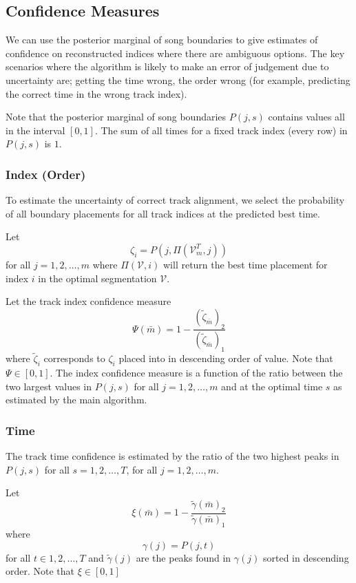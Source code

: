 \documentclass[twocolumn]{article}
\newcommand{\best}{\mathcal V}
\begin{document}
\subsection{Confidence Measures}

We can use the posterior marginal of song boundaries to give estimates of confidence on reconstructed indices where there are ambiguous options. The key scenarios where the algorithm is likely to make an error of judgement due to uncertainty are; getting the time wrong, the order wrong (for example, predicting the correct time in the wrong track index).

Note that the posterior marginal of song boundaries $P(j,s)$ contains values all in the interval $[0,1]$. The sum of all times for a fixed track index (every row) in $P(j,s)$ is $1$.

\subsubsection{Index (Order)}

To estimate the uncertainty of correct track alignment, we select the probability of all boundary placements for all track indices at the predicted best time. 

Let 
\[
\zeta_{ i} = P\left( j, \Pi\left(\best^T_m,j\right)  \right)
\] for all $j=1,2,\ldots,m$ where $\Pi(\best,i)$ will return the best time placement for index $i$ in the optimal segmentation $\best$.

Let the track index confidence measure 
\[
\Psi(\bar m)= 1- \frac{ \left(\tilde \zeta_{\bar m}\right) _2 }{ \left(\tilde \zeta_{\bar m}\right)_1 }
\] where $\tilde \zeta_{i}$ corresponds to $\zeta_{i}$ placed into in descending order of value. Note that $\Psi \in [0,1]$. The index confidence measure is a function of the ratio between the two largest values in $P(j,s)$ for all $j=1,2,\ldots,m$ and at the optimal time $s$ as estimated by the main algorithm. 




\subsubsection{Time}

The track time confidence is estimated by the ratio of the two highest peaks in $P(j,s)$ for all $s=1,2,\ldots,T$, for all $j=1,2,\ldots,m$.

Let 
\[
\xi(\bar m)= 1 - \frac{ \tilde \gamma\left( \bar m \right)  _2 }{ \tilde \gamma\left( \bar m \right)   _1 }
\] where \[
\gamma(j) = P(j,t)
\] for all $t \in 1,2,\ldots,T$ and $\tilde \gamma(j)$ are the peaks found in $\gamma(j)$ sorted in descending order. Note that $\xi \in [0,1]$
\end{document}
